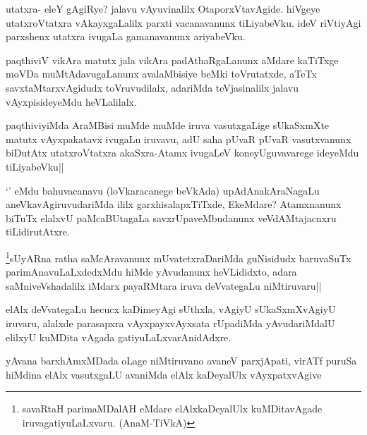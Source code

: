 \begin{artha}
utatxra- eleY gAgiRye? jalavu vAyuvinalilx OtaporxVtavAgide. hiVgeye utatxroVtatxra vAkayxgaLalilx parxti vacanavanunx tiLiyabeVku. ideV riVtiyAgi parxshenx utatxra ivugaLa gamanavanunx ariyabeVku.
\end{artha}


\begin{artha}
paqthiviV vikAra matutx jala vikAra padAthaRgaLanunx aMdare kaTiTxge moVDa muMtAdavugaLanunx avalaMbisiye beMki toVrutatxde, aTeTx savxtaMtarxvAgidudx toVruvudilalx, adariMda teVjasinalilx jalavu vAyxpisideyeMdu heVLalilalx.
\end{artha}

\begin{artha}%
paqthiviyiMda AraMBisi muMde muMde iruva vasutxgaLige sUkaSxmXte matutx vAyxpakatavx ivugaLu iruvavu, adU saha pUvaR pUvaR vasutxvanunx biDutAtx utatxroVtatxra akaSxra-Atamx ivugaLeV koneyUguvavarege ideyeMdu tiLiyabeVku||
\end{artha}

\begin{artha}
`\stext ' eMdu bahuvacanavu (loVkaracanege beVkAda) upAdAnakAraNagaLu aneVkavAgiruvudariMda ililx garxhisalapxTiTxde, EkeMdare? Atamxnanunx biTuTx elalxvU paMcaBUtagaLa savxrUpaveMbudanunx veVdAMtajacnxru tiLidirutAtxre.
\end{artha}

\begin{artha}
\footnote[1]{savaRtaH parimaMDalAH eMdare elAlxkaDeyalUlx kuMDitavAgade iruvagatiyuLaLxvaru. (AnaM-TiVkA)}sUyARna ratha saMcAravanunx mUvatetxraDariMda guNisidudx baruvaSuTx parimAnavuLaLxdedxMdu hiMde yAvudanunx heVLididxto, adara saMniveVshadalilx iMdarx payaRMtara iruva deVvategaLu niMtiruvaru||
\end{artha}

\begin{artha}
elAlx deVvategaLu hecucx kaDimeyAgi sUthxla, vAgiyU sUkaSxmXvAgiyU iruvaru, alalxde parasapxra vAyxpayxvAyxsata rUpadiMda yAvudariMdalU elilxyU kuMDita vAgada gatiyuLaLxvarAnidAdxre.
\end{artha}


\begin{artha}
yAvana barxhAmxMDada oLage niMtiruvano avaneV parxjApati, virATf puruSa hiMdina elAlx vasutxgaLU avaniMda elAlx kaDeyalUlx vAyxpatxvAgive
\end{artha}

